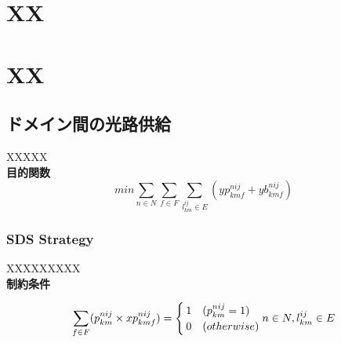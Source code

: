 \documentclass[a4j,twocolumn,fleqn]{jarticle}
\begin{document}
 
\Title
\section{XX}

\section{XX}

\subsection{ドメイン間の光路供給}
XXXXX\\

{\large \bf 目的関数}%
\begin{equation}
min \sum_{n \in N} \sum_{f \in F} \sum_{l^{ij}_{km} \in E}(yp^{nij}_{kmf} + yb^{nij}_{kmf})
\end{equation}
\subsubsection{SDS Strategy}
XXXXXXXXX\\
{\large \bf 制約条件}

\begin{equation}%
\sum_{f \in F} (p^{nij}_{km} \times xp^{nij}_{kmf})= 
\begin{cases}
1 & (p^{nij}_{km} = 1)\\
0 & (otherwise)
\end{cases}
\\n \in N, l^{ij}_{km} \in E \nonumber
\end{equation}%
\end{document}

